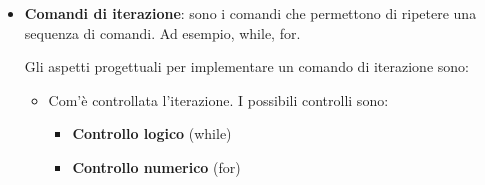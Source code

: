 \documentclass[a4paper]{article}
\begin{document}
\begin{itemize}
\begin{itemize}
      \item \textbf{Selettori a più vie}: permettono di scegliere tra più opzioni a
        seconda di una singola guardia a più valori, come ad esempio il case.
        La sintassi di un tipico selettore a più vie è:
        \[
          \begin{aligned}
            &\texttt{switch (} expr \texttt{) \{} \\
            &\quad \texttt{case } val_1 \texttt{: } stmt_1; \\
            &\quad \vdots \\
            &\quad \texttt{case } val_n \texttt{: } stmt_n; \\
            &\quad [\texttt{default: } stmt_d;] \\
            &\texttt{\}}
          \end{aligned}
        \] 
        dove \( stmt \) è un singolo comando o blocco di codice.

        Gli aspetti progettuali per implementare un case sono:
        \begin{itemize}
          \item Forma e tipo delle espressioni di guardia. Tipicamente espressioni
            non booleane

          \item Come si selezionano i vari rami

          \item Come procede il flusso di controllo. 

          \item Cosa succede per i valori non rappresentati. Alcuni linguaggi dopo
            aver eseguito un ramo escono dal case, altri invece continuano ad eseguire
            i rami successivi, oppure alcuni richiedono un ramo default in caso di
            mancata corrispondenza con i valori di guardia
        \end{itemize}
    \end{itemize}

  \item \textbf{Comandi di iterazione}: sono i comandi che permettono di ripetere una
    sequenza di comandi. Ad esempio, while, for.

    Gli aspetti progettuali per implementare un comando di iterazione sono:
    \begin{itemize}
      \item Com'è controllata l'iterazione. I possibili controlli sono:
        \begin{itemize}
          \item \textbf{Controllo logico} (while)
          \item \textbf{Controllo numerico} (for)
        \end{itemize}


\end{itemize}
\end{itemize}
\end{document}
